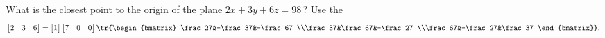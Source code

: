 \begin{activity}
What is the closest point to the origin of the plane \(2x+3y+6z=98\)\,? 
Use the \svd\
\begin{equation*}
\begin{bmatrix} 2&3&6 \end{bmatrix}
=\begin{bmatrix} 1 \end{bmatrix}
\begin{bmatrix} 7&0&0 \end{bmatrix}
\tr{\begin{bmatrix} \frac27&-\frac37&-\frac67
\\\frac37&\frac67&-\frac27
\\\frac67&-\frac27&\frac37 \end{bmatrix}}.
\end{equation*}
\end{activity}





